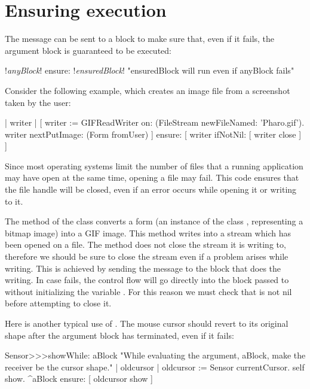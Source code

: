 \documentclass[a4paper,10pt,twoside]{book}
\begin{document}
\section{Ensuring execution}

The  message can be sent to a block to make sure that, even if it fails, the argument block is guaranteed to be executed:
\begin{code}{}
!\emph{anyBlock}! ensure: !\emph{ensuredBlock}!    "ensuredBlock will run even if anyBlock fails"
\end{code}

Consider the following example, which creates an image file from a screenshot taken by the user:

\begin{code}{}
| writer |
[	writer := GIFReadWriter on: (FileStream newFileNamed: 'Pharo.gif').
	writer nextPutImage: (Form fromUser)
]	ensure: [ writer ifNotNil: [ writer close ] ]
\end{code}

Since most operating systems limit the number of files that a running application may have open at the same time, opening a file may fail.
This code ensures that the  file handle will be closed, even if an error occurs while opening it or writing to it.

The  method of the class  converts a form (\ie an instance of the class , representing a bitmap image) into a GIF image. This method writes into a stream which has been opened on a file. The  method does not close the stream it is writing to, therefore we should be sure to close the stream even if a problem arises while writing. This is achieved by sending the message  to the block that does the writing. In case  fails, the control flow will go directly into the block passed to  without initializing the variable . For this reason we must check that  is not nil before attempting to close it.

Here is another typical use of .
The mouse cursor should revert to its original shape after the argument block has terminated, even if it fails:

\begin{code}{}
Sensor>>>showWhile: aBlock 
	"While evaluating the argument, aBlock,
	make the receiver be the cursor shape."
	| oldcursor |
	oldcursor := Sensor currentCursor.
	self show.
	^aBlock ensure: [ oldcursor show ]
\end{code}
\end{document}
